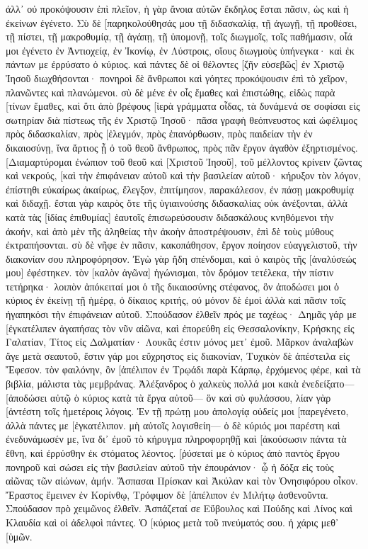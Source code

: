 ἀλλ᾽ οὐ προκόψουσιν ἐπὶ πλεῖον, ἡ γὰρ ἄνοια αὐτῶν ἔκδηλος ἔσται πᾶσιν, ὡς καὶ ἡ ἐκείνων ἐγένετο. 
Σὺ δὲ [παρηκολούθησάς μου τῇ διδασκαλίᾳ, τῇ ἀγωγῇ, τῇ προθέσει, τῇ πίστει, τῇ μακροθυμίᾳ, τῇ ἀγάπῃ, τῇ ὑπομονῇ, 
τοῖς διωγμοῖς, τοῖς παθήμασιν, οἷά μοι ἐγένετο ἐν Ἀντιοχείᾳ, ἐν Ἰκονίῳ, ἐν Λύστροις, οἵους διωγμοὺς ὑπήνεγκα· καὶ ἐκ πάντων με ἐρρύσατο ὁ κύριος. 
καὶ πάντες δὲ οἱ θέλοντες [ζῆν εὐσεβῶς] ἐν Χριστῷ Ἰησοῦ διωχθήσονται· 
πονηροὶ δὲ ἄνθρωποι καὶ γόητες προκόψουσιν ἐπὶ τὸ χεῖρον, πλανῶντες καὶ πλανώμενοι. 
σὺ δὲ μένε ἐν οἷς ἔμαθες καὶ ἐπιστώθης, εἰδὼς παρὰ [τίνων ἔμαθες, 
καὶ ὅτι ἀπὸ βρέφους [ἱερὰ γράμματα οἶδας, τὰ δυνάμενά σε σοφίσαι εἰς σωτηρίαν διὰ πίστεως τῆς ἐν Χριστῷ Ἰησοῦ· 
πᾶσα γραφὴ θεόπνευστος καὶ ὠφέλιμος πρὸς διδασκαλίαν, πρὸς [ἐλεγμόν, πρὸς ἐπανόρθωσιν, πρὸς παιδείαν τὴν ἐν δικαιοσύνῃ, 
ἵνα ἄρτιος ᾖ ὁ τοῦ θεοῦ ἄνθρωπος, πρὸς πᾶν ἔργον ἀγαθὸν ἐξηρτισμένος. 
[Διαμαρτύρομαι ἐνώπιον τοῦ θεοῦ καὶ [Χριστοῦ Ἰησοῦ], τοῦ μέλλοντος κρίνειν ζῶντας καὶ νεκρούς, [καὶ τὴν ἐπιφάνειαν αὐτοῦ καὶ τὴν βασιλείαν αὐτοῦ· 
κήρυξον τὸν λόγον, ἐπίστηθι εὐκαίρως ἀκαίρως, ἔλεγξον, ἐπιτίμησον, παρακάλεσον, ἐν πάσῃ μακροθυμίᾳ καὶ διδαχῇ. 
ἔσται γὰρ καιρὸς ὅτε τῆς ὑγιαινούσης διδασκαλίας οὐκ ἀνέξονται, ἀλλὰ κατὰ τὰς [ἰδίας ἐπιθυμίας] ἑαυτοῖς ἐπισωρεύσουσιν διδασκάλους κνηθόμενοι τὴν ἀκοήν, 
καὶ ἀπὸ μὲν τῆς ἀληθείας τὴν ἀκοὴν ἀποστρέψουσιν, ἐπὶ δὲ τοὺς μύθους ἐκτραπήσονται. 
σὺ δὲ νῆφε ἐν πᾶσιν, κακοπάθησον, ἔργον ποίησον εὐαγγελιστοῦ, τὴν διακονίαν σου πληροφόρησον. 
Ἐγὼ γὰρ ἤδη σπένδομαι, καὶ ὁ καιρὸς τῆς [ἀναλύσεώς μου] ἐφέστηκεν. 
τὸν [καλὸν ἀγῶνα] ἠγώνισμαι, τὸν δρόμον τετέλεκα, τὴν πίστιν τετήρηκα· 
λοιπὸν ἀπόκειταί μοι ὁ τῆς δικαιοσύνης στέφανος, ὃν ἀποδώσει μοι ὁ κύριος ἐν ἐκείνῃ τῇ ἡμέρᾳ, ὁ δίκαιος κριτής, οὐ μόνον δὲ ἐμοὶ ἀλλὰ καὶ πᾶσιν τοῖς ἠγαπηκόσι τὴν ἐπιφάνειαν αὐτοῦ. 
Σπούδασον ἐλθεῖν πρός με ταχέως· 
Δημᾶς γάρ με [ἐγκατέλιπεν ἀγαπήσας τὸν νῦν αἰῶνα, καὶ ἐπορεύθη εἰς Θεσσαλονίκην, Κρήσκης εἰς Γαλατίαν, Τίτος εἰς Δαλματίαν· 
Λουκᾶς ἐστιν μόνος μετ᾽ ἐμοῦ. Μᾶρκον ἀναλαβὼν ἄγε μετὰ σεαυτοῦ, ἔστιν γάρ μοι εὔχρηστος εἰς διακονίαν, 
Τυχικὸν δὲ ἀπέστειλα εἰς Ἔφεσον. 
τὸν φαιλόνην, ὃν [ἀπέλιπον ἐν Τρῳάδι παρὰ Κάρπῳ, ἐρχόμενος φέρε, καὶ τὰ βιβλία, μάλιστα τὰς μεμβράνας. 
Ἀλέξανδρος ὁ χαλκεὺς πολλά μοι κακὰ ἐνεδείξατο—[ἀποδώσει αὐτῷ ὁ κύριος κατὰ τὰ ἔργα αὐτοῦ— 
ὃν καὶ σὺ φυλάσσου, λίαν γὰρ [ἀντέστη τοῖς ἡμετέροις λόγοις. 
Ἐν τῇ πρώτῃ μου ἀπολογίᾳ οὐδείς μοι [παρεγένετο, ἀλλὰ πάντες με [ἐγκατέλιπον. μὴ αὐτοῖς λογισθείη— 
ὁ δὲ κύριός μοι παρέστη καὶ ἐνεδυνάμωσέν με, ἵνα δι᾽ ἐμοῦ τὸ κήρυγμα πληροφορηθῇ καὶ [ἀκούσωσιν πάντα τὰ ἔθνη, καὶ ἐρρύσθην ἐκ στόματος λέοντος. 
[ῥύσεταί με ὁ κύριος ἀπὸ παντὸς ἔργου πονηροῦ καὶ σώσει εἰς τὴν βασιλείαν αὐτοῦ τὴν ἐπουράνιον· ᾧ ἡ δόξα εἰς τοὺς αἰῶνας τῶν αἰώνων, ἀμήν. 
Ἄσπασαι Πρίσκαν καὶ Ἀκύλαν καὶ τὸν Ὀνησιφόρου οἶκον. 
Ἔραστος ἔμεινεν ἐν Κορίνθῳ, Τρόφιμον δὲ [ἀπέλιπον ἐν Μιλήτῳ ἀσθενοῦντα. 
Σπούδασον πρὸ χειμῶνος ἐλθεῖν. Ἀσπάζεταί σε Εὔβουλος καὶ Πούδης καὶ Λίνος καὶ Κλαυδία καὶ οἱ ἀδελφοὶ πάντες. 
Ὁ [κύριος μετὰ τοῦ πνεύματός σου. ἡ χάρις μεθ᾽ [ὑμῶν. 
